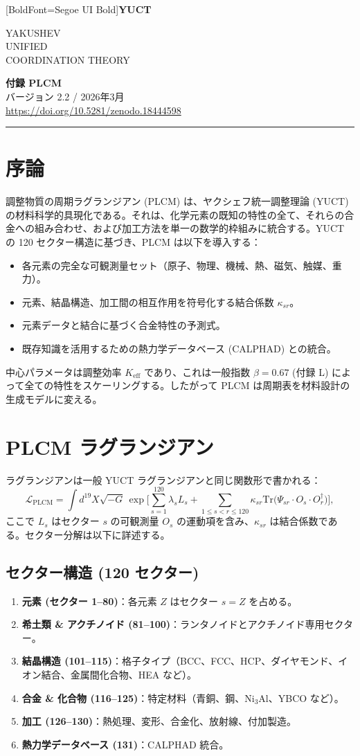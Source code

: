 \documentclass[11pt,a4paper]{article}
\newcommand{\Keff}{K_{\mathrm{eff}}}
\newcommand{\be}{\beta}          %
\theoremstyle{remark}
\newcommand{\makeheader}{%
	\noindent
	\begin{minipage}{0.17\textwidth}
		\raggedright
		{\fontspec{Segoe UI}[BoldFont=Segoe UI Bold]\bfseries\color{skyblue}\fontsize{46}{46}\selectfont YUCT}%
	\end{minipage}%
	\hspace{30pt}
	\begin{minipage}{0.32\textwidth}
		\raggedright
		{\sffamily\fontsize{11}{13}\selectfont YAKUSHEV\\ UNIFIED\\ COORDINATION THEORY}%
	\end{minipage}%
	\hfill
	\begin{minipage}{0.38\textwidth}
		\raggedleft
		{\sffamily\bfseries 付録 PLCM}\\ 
		{\sffamily バージョン 2.2 / 2026年3月}\\ 
		{\sffamily\footnotesize \url{https://doi.org/10.5281/zenodo.18444598}}%
	\end{minipage}
	\par\vspace{5pt}
	\noindent\textcolor{gold}{\rule{\textwidth}{1.6pt}}
	\par\vspace{0pt}
}
\begin{document}
	\makeheader
	\thispagestyle{firstpage}
	\vspace{15pt}
	
	\tableofcontents
	\newpage
	
	\section{序論}
	
	調整物質の周期ラグランジアン (PLCM) は、ヤクシェフ統一調整理論 (YUCT) の材料科学的具現化である。それは、化学元素の既知の特性の全て、それらの合金への組み合わせ、および加工方法を単一の数学的枠組みに統合する。YUCT の 120 セクター構造に基づき、PLCM は以下を導入する：
	\begin{itemize}
		\item 各元素の完全な可観測量セット（原子、物理、機械、熱、磁気、触媒、重力）。
		\item 元素、結晶構造、加工間の相互作用を符号化する結合係数 \(\kappa_{sr}\)。
		\item 元素データと結合に基づく合金特性の予測式。
		\item 既存知識を活用するための熱力学データベース (CALPHAD) との統合。
	\end{itemize}
	中心パラメータは調整効率 \(\Keff\) であり、これは一般指数 \(\be = 0.67\) (付録 L) によって全ての特性をスケーリングする。したがって PLCM は周期表を材料設計の生成モデルに変える。
	
	\section{PLCM ラグランジアン}
	
	ラグランジアンは一般 YUCT ラグランジアンと同じ関数形で書かれる：
	\[
	\mathcal{L}_{\text{PLCM}} = \int d^{19}X \sqrt{-G} \,
	\exp\Bigg[ \sum_{s=1}^{120} \lambda_s L_s + \sum_{1\le s<r\le 120} \kappa_{sr} \mathrm{Tr}\big(\Psi_{sr} \cdot O_s \cdot O_r^\dagger\big) \Bigg],
	\]
	ここで \(L_s\) はセクター \(s\) の可観測量 \(O_s\) の運動項を含み、\(\kappa_{sr}\) は結合係数である。セクター分解は以下に詳述する。
	
	\subsection{セクター構造 (120 セクター)}
	
	\begin{enumerate}
		\item \textbf{元素 (セクター 1–80)}：各元素 \(Z\) はセクター \(s=Z\) を占める。
		\item \textbf{希土類 \& アクチノイド (81–100)}：ランタノイドとアクチノイド専用セクター。
		\item \textbf{結晶構造 (101–115)}：格子タイプ（BCC、FCC、HCP、ダイヤモンド、イオン結合、金属間化合物、HEA など）。
		\item \textbf{合金 \& 化合物 (116–125)}：特定材料（青銅、鋼、Ni\(_{3}\)Al、YBCO など）。
		\item \textbf{加工 (126–130)}：熱処理、変形、合金化、放射線、付加製造。
		\item \textbf{熱力学データベース (131)}：CALPHAD 統合。
	\end{enumerate}
	
\end{document}

